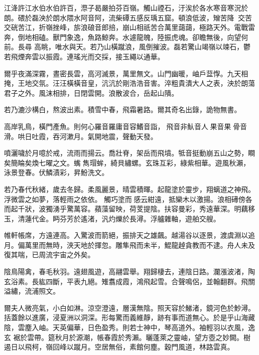 \begin{pinyinscope}
 江洚許江水伯水伯許百，漈子曷嚴拍芬百嶺。觸山禋石，汙涘於各水寒音寒況於朗。碨於磊泱於朗水隈水阿音阿，流柴磹五感反瑀五窟。頓浪低波，矰苦降交苦交硄苦江，折嶺挫峰，旂浪硠音郎掊，崩山相祇苦合萬里藹藹，極路天外。電戰雷奔，倒地相磕。獸門象逸，魚路鯨奔。水遽龍魄，陸振虎魂。卻瞻無後，向望何前。長尋
 高眺，唯水與天。若乃山橫蹴浪，風倒摧波。磊若驚山竭嶺以竦石，鬱若飛煙奔雲以振霞。連瑤光而交採，接玉繩以通華。



 爾乎夜滿深霧，晝密長雲，高河滅景，萬里無文。山門幽暖，岫戶葐惸。九天相掩，王地交氛。汪汪橫橫音皇，沆沆於剛浩浩音害。淬粗貴潰大人之表，泱於朗蕩君子之外。風沫相排，日閉雲開。浪散波合，岳起山隤。



 若乃漉沙構白，熬波出素。積雪中春，飛霜暑路。爾其奇名出錄，詭物無書。



 高岸乳鳥，橫門產魚。則何心羅音羅庸音容鰭音詣，飛音非魜音人果音果骨音滑。哄日吐霞，吞河漱月。氣開地震，聲動天發。



 噴灑噦於月噫於戒，流雨而揚云。喬壯脊，架岳而飛墳。牴音挺動崩五山之勢，瞷矣簡睔矣煥七曜之文。蟕雋瑁蛑，綺貝繡螺。玄珠互彩，綠紫相華。遊風秋瀨，泳景登春。伏鱗漬彩，昇魵洗文。



 若乃春代秋緒，歲去冬歸。柔風麗景，晴雲積暉。起龍塗於靈步，翔螭道之神飛。浮微雲之如夢，落輕雨之依依。
 觸巧塗而感云紺遠，抵欒木以激揚。浪相礡傍各而起千狀，波獨湧乎驚萬容。蘋藻留映，荷芰提陰。扶容曼彩，秀遠華深。明藕移玉，清蓮代金。眄芬芳於遙渚，汎灼爍於長潯。浮艫雜軸，遊舶交艘。



 帷軒帳席，方遠連高。入驚波而箭絕，振排天之雄飆。越湯谷以逐景，渡虞淵以追月。偏萬里而無時，浹天地於揮忽。雕隼飛而未半，鯤龍趠貪教而不逮。舟人未及復其喘，已周流宇宙之外矣。



 陰鳥陽禽，春毛秋羽。遠翅風遊，高翮雲舉。翔歸棲去，連陰日路。瀾漲波渚，陶玄浴素。長紘四斷，平表九絕。雉翥成霞，鴻飛起雪。合聲鳴侶，並翰翻群。飛關溢繡，流浦照文。



 爾夫人微亮氣，小白如淋。涼空澄遠，層漢無陰。照天容於鮷渚，鏡河色於魦潯。括蓋餘以進廣，浸夏洲以洞深。形每驚而義維靜，跡有事而道無心。於是乎山海藏陰，雲塵入岫。天英偏華，日色盈秀。則若士神中，琴高道外。袖輕羽以衣風，逸玄
 裾於雲帶。筵秋月於源潮，帳春霞於秀瀨。曬蓬萊之靈岫，望方壺之妙闕。樹遏日以飛柯，嶺回峰以蹴月。空居無俗，素館何塵。穀門風道，林路雲真。




\end{pinyinscope}
